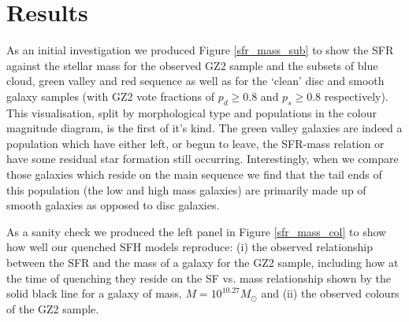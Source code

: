 \documentclass{mn2e}
\begin{document}
\section{Results}\label{results}


As an initial investigation we produced Figure \ref{sfr_mass_sub} to show the SFR against the stellar mass for the observed GZ2 sample and the subsets of blue cloud, green valley and red sequence as well as for the `clean' disc and smooth galaxy samples (with GZ2 vote fractions of $p_d \geq 0.8$ and $p_s \geq 0.8$ respectively). This visualisation, split by morphological type and populations in the colour magnitude diagram, is the first of it's kind. The green valley galaxies are indeed a population which have either left, or begun to leave, the SFR-mass relation or have some residual star formation still occurring. Interestingly, when we compare those galaxies which reside on the main sequence we find that the tail ends of this population (the low and high mass  galaxies) are primarily made up of smooth galaxies as opposed to disc galaxies.

As a sanity check we produced the left panel in Figure \ref{sfr_mass_col} to show how well our quenched SFH models reproduce: (i) the observed relationship between the SFR and the mass of a galaxy for the GZ2 sample, including how at the time of quenching they reside on the SF vs. mass relationship shown by the solid black line for a galaxy of mass, $M = 10^{10.27} M_{\odot}$ and (ii) the observed colours of the GZ2 sample. 

%
\end{document}
